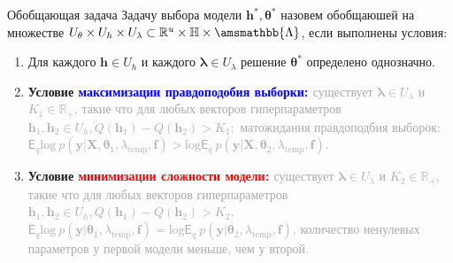 \documentclass[usenames,dvipsnames,11pt,pdf,utf8,russian,aspectratio=43]{beamer}
\begin{document}
                                                                                                              


   
\begin{frame}{Обобщающая задача}
\footnotesize
Задачу выбора модели $\mathbf{h}^{*}, \boldsymbol{\theta}^{*}$ назовем обобщаюшей на множестве $U_{\theta}\times U_{h} \times U_{\lambda} \subset \mathbb{R}^{u} \times \mathbb{H} \times \amsmathbb{\Lambda}$, если выполнены условия:
\begin{enumerate}
\item Для каждого $\mathbf{h} \in U_h$ и каждого $\boldsymbol{\lambda} \in U_{\lambda}$ решение $\boldsymbol{\theta}^{*}$ определено однозначно.
\item \textbf{Условие \textcolor{blue}{максимизации правдоподобия выборки: }}\textcolor{darkgray}{ существует $\boldsymbol{\lambda} \in U_{\lambda}$ и  $K_1 \in \mathbb{R}_{+}$, такие что для любых векторов гиперпараметров $\mathbf{h}_1, \mathbf{h}_2 \in  U_{h}, Q(\mathbf{h}_1) - Q(\mathbf{h}_2) > K_1:$ матожидания правдоподбия выборок: $\mathsf{E}_q \text{log}~p(\mathbf{y}|\mathbf{X}, \boldsymbol{\theta}_1, \lambda_{\text{temp}}, \mathbf{f})>\text{log}\mathsf{E}_q ~p(\mathbf{y}|\mathbf{X}, \boldsymbol{\theta}_2, \lambda_{\text{temp}}, \mathbf{f})$.}

\item \textbf{Условие \textcolor{red}{минимизации сложности модели: }}\textcolor{darkgray}{ существует  $\boldsymbol{\lambda} \in U_{\lambda}$ и $K_2 \in \mathbb{R}_{+}$, такие что для любых векторов гиперпараметров $\mathbf{h}_1, \mathbf{h}_2 \in U_h, Q(\mathbf{h}_1) - Q(\mathbf{h}_2) > K_2$,  $\mathsf{E}_q \text{log}~p(\mathbf{y}|\boldsymbol{\theta}_1, \lambda_{\text{temp}}, \mathbf{f}) = \text{log}\mathsf{E}_q ~p(\mathbf{y}|\boldsymbol{\theta}_2, \lambda_{\text{temp}}, \mathbf{f})$, количество ненулевых параметров у первой модели меньше, чем у второй.}


\end{enumerate}
\end{frame}
\end{document}
